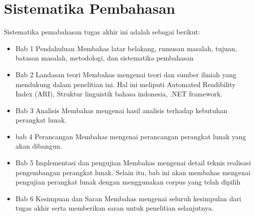 \section{Sistematika Pembahasan}
Sistematika pemabahasan tugas akhir ini adalah sebagai berikut:
\label{sec:sispem}
\begin{itemize}
    \item Bab 1 Pendahuluan
    Membahas latar belakang, rumusan masalah, tujuan, batasan masalah, metodologi, dan sistematika pembahasan
    \item Bab 2 Landasan teori
    Membahas mengenai teori dan sumber ilmiah yang mendukung dalam penelitian ini. Hal ini meliputi Automated Readibility Index (ARI), Struktur linguistik bahasa indonesia, .NET framework.
    \item Bab 3 Analisis
    Membahas mengenai hasil analisis terhadap kebutuhan perangkat lunak.
    \item bab 4 Perancangan
    Membahas mengenai perancangan perangkat lunak yang akan dibangun.
    \item Bab 5 Implementasi dan pengujian
    Membahas mengenai detail teknis realisasi pengembangan perangkat lunak. Selain itu, bab ini akan membahas mengenai pengujian perangkat lunak dengan menggunakan corpus yang telah dipilih
    \item Bab 6 Kesimpuan dan Saran
    Membahas mengenai seluruh kesimpulan dari tugas akhir serta memberikan saran untuk penelitian selanjutnya.
\end{itemize}